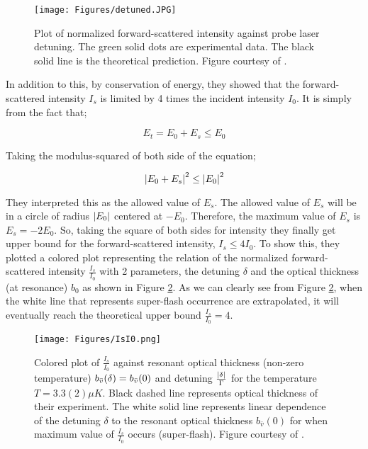 \begin{figure}
    \centering
    \texttt{[image: Figures/detuned.JPG]}
    \caption{Plot of normalized forward-scattered intensity against probe laser detuning. The green solid dots are experimental data. The black solid line is the theoretical prediction. Figure courtesy of \protect\cite{Kwong2014}.}
    \label{fig: detuned}
\end{figure}

In addition to this, by conservation of energy, they showed that the forward-scattered intensity $I_{s}$ is limited by 4 times the incident intensity $I_{0}$. It is simply from the fact that;

\begin{equation}
    E_{t} = E_{0} + E_{s} \leq E_{0}
\end{equation}

Taking the modulus-squared of both side of the equation;

\begin{equation}
    \abs{E_{0} + E_{s}}^{2} \leq \abs{E_{0}}^{2}
\end{equation}

They interpreted this as the allowed value of $E_{s}$. The allowed value of $E_{s}$ will be in a circle of radius $\abs{E_{0}}$ centered at $-E_{0}$. Therefore, the maximum value of $E_{s}$ is $E_{s} = -2 E_{0}$. So, taking the square of both sides for intensity they finally get upper bound for the forward-scattered intensity, $I_{s} \leq 4 I_{0}$. To show this, they plotted a colored plot representing the relation of the normalized forward-scattered intensity $\frac{I_{s}}{I_{0}}$ with 2 parameters, the detuning $\delta$ and the optical thickness (at resonance) $b_{0}$ as shown in Figure \ref{fig: I_s/I_0}. As we can clearly see from Figure \ref{fig: I_s/I_0}, when the white line that represents super-flash occurrence are extrapolated, it will eventually reach the theoretical upper bound $\frac{I_{s}}{I_{0}} = 4$.

\begin{figure}
    \centering
    \texttt{[image: Figures/IsI0.png]}
    \caption{Colored plot of $\frac{I_{s}}{I_{0}}$  against resonant optical thickness (non-zero temperature) $b_{\bar{v}}(\delta) = b_{\Bar{v}}(0)$ and detuning $\frac{\abs{\delta}}{\Gamma}$ for the temperature $T = 3.3(2) \mu K$. Black dashed line represents optical thickness of their experiment. The white solid line represents linear dependence of the detuning $\delta$ to the resonant optical thickness $b_{\bar{v}}(0)$ for when maximum value of $\frac{I_{s}}{I_{0}}$ occurs (super-flash). Figure courtesy of \protect\cite{Kwong2014}.}
    \label{fig: I_s/I_0}
\end{figure}

